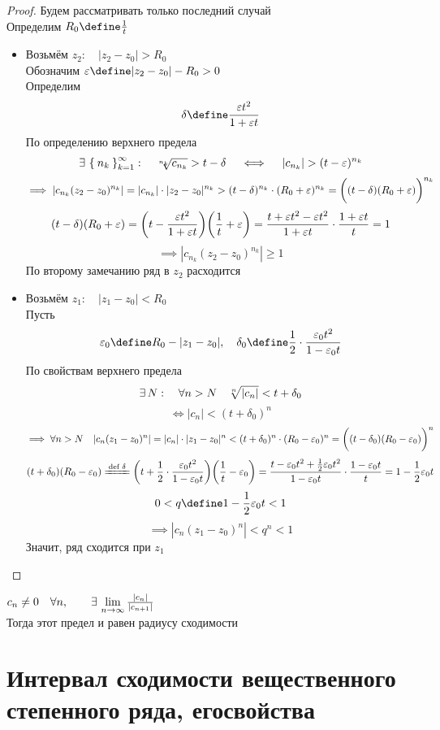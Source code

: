 \begin{proof}
	Будем рассматривать только последний случай \\
	Определим $ R_0 \define \frac1t $
	\begin{itemize}
		\item Возьмём $ z_2 : \quad |z_2 - z_0| > R_0 $ \\
		Обозначим $ \veps \define |z_2 - z_0| - R_0 > 0 $ \\
		Определим
		$$ \delta \define \frac{\veps t^2}{1 + \veps t} $$
		По определению верхнего предела
		$$ \exists\, \Set{n_k}_{k=1}^{\infty} : \quad \sqrt[n_k]{c_{n_k}} > t - \delta \quad \iff \quad |c_{n_k}| > (t - \varepsilon)^{n_k} $$
		$$ \implies |c_{n_k}(z_2 - z_0)^{n_k}| = |c_{n_k}| \cdot |z_2 - z_0|^{n_k} > (t - \delta)^{n_k} \cdot (R_0 + \varepsilon)^{n_k} = \bigg( (t - \delta)(R_0 + \varepsilon) \bigg)^{n_k} $$
		$$ (t - \delta)(R_0 + \varepsilon) = \bigg( t - \frac{\varepsilon t^2}{1 + \varepsilon t} \bigg)\bigg( \frac1t + \varepsilon \bigg) = \frac{t + \varepsilon t^2 - \varepsilon t^2}{1 + \varepsilon t} \cdot \frac{1 + \varepsilon t}t = 1 $$
		$$ \implies |c_{n_k}(z_2 - z_0)^{n_k}| \ge 1 $$
		По второму замечанию ряд в $ z_2 $ расходится
		\item Возьмём $ z_1 : \quad |z_1 - z_0| < R_0 $ \\
		Пусть
		$$ \veps_0 \define R_0 - |z_1 - z_0|, \quad \delta_0 \define \half \cdot \frac{\veps_0t^2}{1 - \veps_0t} $$
		По свойствам верхнего предела
		$$ \exists\, N : \quad \forall n > N \quad \sqrt[n]{|c_n|} < t + \delta_0 $$
		$$ \iff |c_n| < (t + \delta_0)^n $$
		$$ \implies \forall n > N \quad |c_n(z_1 - z_0)^n| = |c_n| \cdot |z_1 - z_0|^n < (t + \delta_0)^n \cdot (R_0 - \varepsilon_0)^n = \bigg( (t - \delta_0)(R_0 - \varepsilon_0) \bigg)^n $$
		$$ (t + \delta_0)(R_0 - \veps_0) \bdefeq{\delta} \bigg( t + \half \cdot \frac{\veps_0t^2}{1 - \veps_0t} \bigg) \bigg( \frac1t - \veps_0 \bigg) = \frac{t - \veps_0t^2 + \half\veps_0t^2}{1 - \veps_0t} \cdot \frac{1 - \veps_0t}{t} = 1 - \half\veps_0t $$
		$$ 0 < q \define 1 -\half \veps_0t < 1 $$
		$$ \implies |c_n(z_1 - z_0)^n| < q^n < 1 $$
		Значит, ряд сходится при $ z_1 $
	\end{itemize}
\end{proof}

\begin{theorem}
	$ c_n \ne 0 \quad \forall n, \qquad \exists\, \lim\limits_{n\to\infty} \frac{|c_n|}{|c_{n + 1}|} $ \\
	Тогда этот предел и равен радиусу сходимости
\end{theorem}

\section{Интервал сходимости вещественного степенного ряда, его\n свойства}

